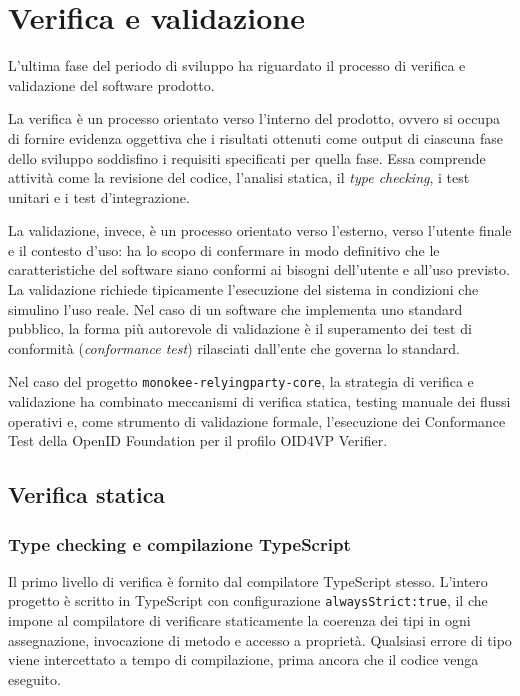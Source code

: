 \chapter{Verifica e validazione}
\label{cap:verifica_validazione}
L'ultima fase del periodo di sviluppo ha riguardato il processo di verifica e validazione del software prodotto.

La verifica è un processo orientato verso l'interno del prodotto, ovvero si occupa di fornire evidenza oggettiva che i risultati ottenuti come output di ciascuna fase dello sviluppo soddisfino i requisiti specificati per quella fase. Essa comprende attività come la revisione del codice, l'analisi statica, il \textit{type checking}, i test unitari e i test d'integrazione.

La validazione, invece, è un processo orientato verso l'esterno, verso l'utente finale e il contesto d'uso: ha lo scopo di confermare in modo definitivo che le caratteristiche del software siano conformi ai bisogni dell'utente e all'uso previsto. La validazione richiede tipicamente l'esecuzione del sistema in condizioni che simulino l'uso reale. Nel caso di un software che implementa uno standard pubblico, la forma più autorevole di validazione è il superamento dei test di conformità (\textit{conformance test}) rilasciati dall'ente che governa lo standard.

Nel caso del progetto \texttt{monokee-\allowbreak{}relyingparty-\allowbreak{}core}, la strategia di verifica e validazione ha combinato meccanismi di verifica statica, testing manuale dei flussi operativi e, come strumento di validazione formale, l'esecuzione dei Conformance Test della OpenID Foundation\glsfirstoccur{} per il profilo OID4VP Verifier.

\section{Verifica statica}
\label{sec:verifica_statica}

\subsection{Type checking e compilazione TypeScript}
Il primo livello di verifica è fornito dal compilatore TypeScript stesso. L'intero progetto è scritto in TypeScript con configurazione \texttt{alwaysStrict:true}, il che impone al compilatore di verificare staticamente la coerenza dei tipi in ogni assegnazione, invocazione di metodo e accesso a proprietà. Qualsiasi errore di tipo viene intercettato a tempo di compilazione, prima ancora che il codice venga eseguito.

